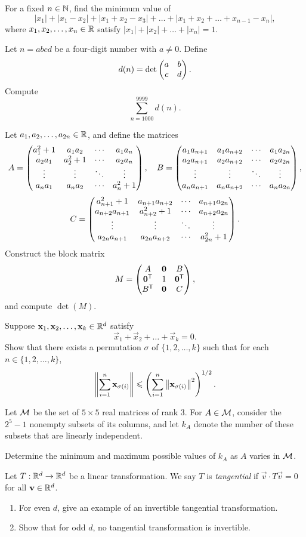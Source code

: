 \documentclass[12pt]{memoir}
\begin{document}
\begin{Ej}
For a fixed $n\in\mathbb{N}$, find the minimum value of
\[
    |x_1|+|x_1-x_2|+|x_1+x_2-x_3|+\dots+|x_1+x_2+\dots+x_{n-1}-x_n|,
\]
where $x_1,x_2,\dots,x_n\in\mathbb{R}$ satisfy $|x_1|+|x_2|+\dots+|x_n|=1$.
\end{Ej}

\begin{Ej}
Let $n=abcd$ be a four-digit number with $a\neq 0$. Define
\[
    d(n)=\det\begin{pmatrix} a & b \\ c & d \end{pmatrix}.
\]
Compute
\[
    \sum_{n=1000}^{9999} d(n).
\]
\end{Ej}

\begin{Ej}
Let $a_1,a_2,\dots,a_{2n}\in\mathbb{R}$, and define the matrices
\[
    A=\begin{pmatrix} a_1^2+1 & a_1a_2 & \cdots & a_1a_n\\ a_2a_1 & a_2^2+1 & \cdots & a_2a_n \\ \vdots & \vdots & \ddots & \vdots \\ a_na_1 & a_na_2 & \cdots & a_n^2+1 \end{pmatrix},\quad 
    B=\begin{pmatrix} a_1a_{n+1} & a_1a_{n+2} & \cdots & a_1a_{2n}\\ a_2a_{n+1} & a_2a_{n+2} & \cdots & a_2a_{2n} \\ \vdots & \vdots & \ddots & \vdots \\ a_na_{n+1} & a_na_{n+2} & \cdots & a_na_{2n} \end{pmatrix},
\]
\[
    C=\begin{pmatrix} a_{n+1}^2+1 & a_{n+1}a_{n+2} & \cdots & a_{n+1}a_{2n}\\ a_{n+2}a_{n+1} & a_{n+2}^2+1 & \cdots & a_{n+2}a_{2n} \\ \vdots & \vdots & \ddots & \vdots \\ a_{2n}a_{n+1} & a_{2n}a_{n+2} & \cdots & a_{2n}^2+1 \end{pmatrix}.
\]
Construct the block matrix
\[
    M=\begin{pmatrix} A & \mathbf{0} & B \\ \mathbf{0}^{\mathsf{T}} & 1 & \mathbf{0}^{\mathsf{T}} \\ B^{\mathsf{T}} & \mathbf{0} & C \end{pmatrix},
\]
and compute $\det(M)$.
\end{Ej}

\begin{Ej}
Suppose $\mathbf{x}_1,\mathbf{x}_2,\dots,\mathbf{x}_k\in\mathbb{R}^d$ satisfy
\[
    \vec{x}_1+\vec{x}_2+\dots+\vec{x}_k=0.
\]
Show that there exists a permutation $\sigma$ of $\{1,2,\dots,k\}$ such that for each $n\in\{1,2,\dots,k\}$,
\[
    \norm{\sum_{i=1}^{n}\mathbf{x}_{\sigma(i)}}\leqslant \left(\sum_{i=1}^n\norm{\mathbf{x}_{\sigma(i)}}^2\right)^{1/2}.
\]
\end{Ej}

\begin{Ej}
Let $\mathcal{M}$ be the set of $5\times 5$ real matrices of rank $3$. For $A\in\mathcal{M}$, consider the $2^5-1$ nonempty subsets of its columns, and let $k_A$ denote the number of these subsets that are linearly independent.\par
Determine the minimum and maximum possible values of $k_A$ as $A$ varies in $\mathcal{M}$.
\end{Ej}

\begin{Ej}
Let $T:\mathbb{R}^d\to\mathbb{R}^d$ be a linear transformation. We say $T$ is \emph{tangential} if $\vec{v}\cdot T\vec{v}=0$ for all $\mathbf{v}\in\mathbb{R}^d$.
\begin{enumerate}
    \item For even $d$, give an example of an invertible tangential transformation.
    \item Show that for odd $d$, no tangential transformation is invertible.
\end{enumerate}
\end{Ej}
\end{document}
